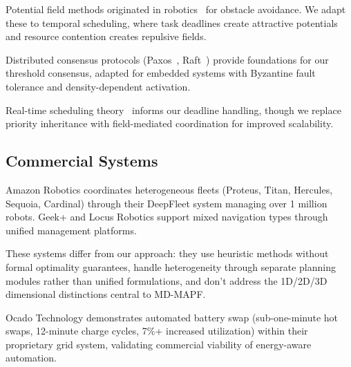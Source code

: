 Potential field methods originated in robotics~\cite{khatib1986potential} for obstacle avoidance. We adapt these to temporal scheduling, where task deadlines create attractive potentials and resource contention creates repulsive fields.

Distributed consensus protocols (Paxos~\cite{lamport1998paxos}, Raft~\cite{ongaro2014raft}) provide foundations for our threshold consensus, adapted for embedded systems with Byzantine fault tolerance and density-dependent activation.

Real-time scheduling theory~\cite{sha1990priority,buttazzo2011real} informs our deadline handling, though we replace priority inheritance with field-mediated coordination for improved scalability.

\subsection{Commercial Systems}

Amazon Robotics coordinates heterogeneous fleets (Proteus, Titan, Hercules, Sequoia, Cardinal) through their DeepFleet system managing over 1 million robots. Geek+ and Locus Robotics support mixed navigation types through unified management platforms.

These systems differ from our approach: they use heuristic methods without formal optimality guarantees, handle heterogeneity through separate planning modules rather than unified formulations, and don't address the 1D/2D/3D dimensional distinctions central to MD-MAPF.

Ocado Technology demonstrates automated battery swap (sub-one-minute hot swaps, 12-minute charge cycles, 7\%+ increased utilization) within their proprietary grid system, validating commercial viability of energy-aware automation.
